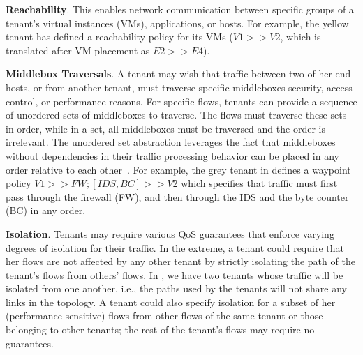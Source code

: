 

\begin{compactitemize}
\item \textbf{Reachability}. This enables network communication
  between specific groups of a tenant's virtual instances (VMs),
  applications, or hosts. For example, the yellow tenant has defined a
  reachability policy for its VMs ($V1 >> V2$, which is translated
  after VM placement as $E2 >> E4$).
\item \textbf{Middlebox Traversals}. A tenant may wish that traffic
  between two of her end hosts, or from another tenant, must traverse
  specific middleboxes %
  security, access control, or performance reasons. For specific
  flows, tenants can provide a sequence of unordered sets of
  middleboxes
  to traverse. The flows must traverse these sets in order,
  while in a set, all middleboxes must be traversed
  and the order is irrelevant.  The
  unordered set abstraction leverages the fact that middleboxes
  without dependencies in their traffic processing behavior can be
  placed in any order relative to each other~\cite{pga}. For example, the grey tenant in 
  defines a waypoint policy $V1 >> FW; [IDS,BC] >> V2$
   which specifies that traffic must first pass through the firewall (FW),
  and then through the IDS and the byte counter (BC) in any order. 


\item \textbf{Isolation}. Tenants may require various QoS guarantees
  that enforce varying degrees of isolation for their traffic. In the
  extreme, a tenant could require that her flows are not affected by
  any other tenant by strictly isolating the path of the tenant's
  flows from others' flows. In , we have two
  tenants whose traffic will be isolated from one another, i.e., the
  paths used by the tenants will not share any links in the topology.
  A tenant could also specify isolation for a subset of her
  (performance-sensitive) flows from other flows of the same tenant or
  those belonging to other tenants; the rest of the tenant's flows may
  require no guarantees.


\end{compactitemize}
